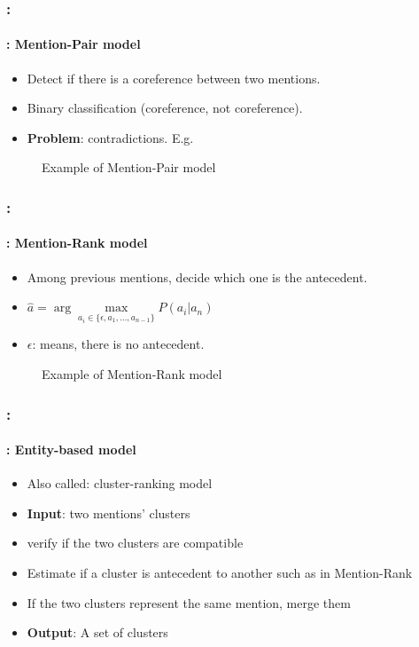 \documentclass[xcolor=table]{beamer}
\begin{document}
\begin{frame}
	\frametitle{\insertshortsubtitle: \insertsection}
	\framesubtitle{\insertsubsection: Mention-Pair model}
	
	\begin{itemize}
		\item Detect if there is a coreference between two mentions.
		\item Binary classification (coreference, not coreference).
		\item \textbf{Problem}: contradictions. E.g. 
	\end{itemize}
	\begin{figure}
		\centering
		\caption{Example of Mention-Pair model \cite{2019-jurafsky-martin}}
	\end{figure}
	
\end{frame}

\begin{frame}
	\frametitle{\insertshortsubtitle: \insertsection}
	\framesubtitle{\insertsubsection: Mention-Rank model}
	
	\begin{itemize}
		\item Among previous mentions, decide which one is the antecedent.
		\item $ \hat{a} = \arg\max\limits_{a_i \in \{\epsilon, a_1, \ldots, a_{n-1}\}} P(a_i|a_n) $
		\item $ \epsilon $: means, there is no antecedent.
	\end{itemize}
	\begin{figure}
		\centering
		\caption{Example of Mention-Rank model \cite{2019-jurafsky-martin}}
	\end{figure}
	
\end{frame}

\begin{frame}
	\frametitle{\insertshortsubtitle: \insertsection}
	\framesubtitle{\insertsubsection: Entity-based model}
	
	\begin{itemize}
		\item Also called: cluster-ranking model
		\item \textbf{Input}: two mentions' clusters
		\item verify if the two clusters are compatible
		\item Estimate if a cluster is antecedent to another such as in Mention-Rank
		\item If the two clusters represent the same mention, merge them
		\item \textbf{Output}: A set of clusters
	\end{itemize}
	
\end{frame}
\end{document}
